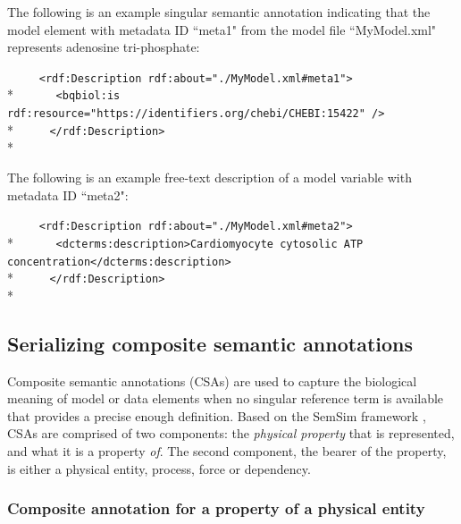 \documentclass[pdftex,rgb,dvipsnames,svgnames,hyperref,table]{report}
\begin{document}
The following is an example singular semantic annotation indicating that the model element with metadata ID ``meta1" from the model file ``MyModel.xml" represents adenosine tri-phosphate:

 \verb|     <rdf:Description rdf:about="./MyModel.xml#meta1">|\\*
 \verb|      <bqbiol:is rdf:resource="https://identifiers.org/chebi/CHEBI:15422" />|\\*
 \verb|     </rdf:Description>|\\*

The following is an example free-text description of a model variable with metadata ID ``meta2": 

 \verb|     <rdf:Description rdf:about="./MyModel.xml#meta2">|\\*
 \verb|      <dcterms:description>Cardiomyocyte cytosolic ATP concentration</dcterms:description>|\\*
 \verb|     </rdf:Description>|\\*
 

\subsection{Serializing composite semantic annotations} \label{CSAs}
Composite semantic annotations (CSAs) are used to capture the biological meaning of model or data elements when no singular reference term is available that provides a precise enough definition. Based on the SemSim framework \cite{Gennari2011}, CSAs are comprised of two components: the \textit{physical property} that is represented, and what it is a property \textit{of}. The second component, the bearer of the property, is either a physical entity, process, force or dependency. 

\subsubsection{Composite annotation for a property of a physical entity}
\label{CSAentity}
\end{document}
